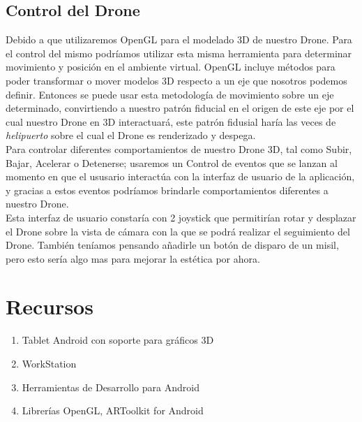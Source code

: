 \documentclass[a4paper]{article}
\begin{document}
\subsection{Control del Drone}
Debido a que utilizaremos OpenGL para el modelado 3D de nuestro Drone. Para el control del mismo podríamos utilizar esta misma herramienta para determinar movimiento y posición en el ambiente virtual. OpenGL incluye métodos para poder transformar o mover modelos 3D respecto a un eje que nosotros podemos definir. Entonces se puede usar esta metodología de movimiento sobre un eje determinado, convirtiendo a nuestro patrón fiducial en el origen de este eje por el cual nuestro Drone en 3D interactuará, este patrón fidusial haría las veces de \textit{helipuerto} sobre el cual el Drone es renderizado y despega.\\
Para controlar diferentes comportamientos de nuestro Drone 3D, tal como Subir, Bajar, Acelerar o Detenerse; usaremos un Control de eventos que se lanzan al momento en que el ususario interactúa con la interfaz de usuario de la aplicación, y gracias a estos eventos podríamos brindarle comportamientos diferentes a nuestro Drone.\\
Esta interfaz de usuario constaría con 2 joystick que permitirían rotar y desplazar el Drone sobre la vista de cámara con la que se podrá realizar el seguimiento del Drone. También teníamos pensando añadirle un botón de disparo de un misil, pero esto sería algo mas para mejorar la estética por ahora.

\section{Recursos}
\begin{enumerate}
  \item Tablet Android con soporte para gráficos 3D
  \item WorkStation
  \item Herramientas de Desarrollo para Android
  \item Librerías OpenGL, ARToolkit for Android
\end{enumerate}




%

\end{document}
